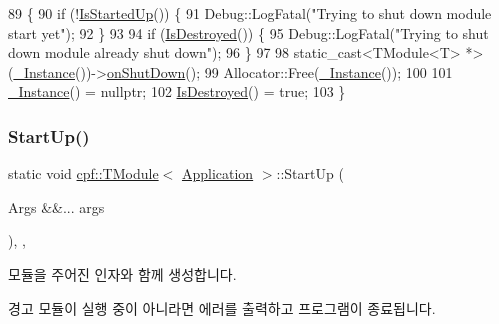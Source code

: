 \begin{DoxyCode}
89                                \{
90             \textcolor{keywordflow}{if} (!\hyperlink{classcpf_1_1_t_module_a73732afee7131dad652bf3e00c75cef9}{IsStartedUp}()) \{
91                 Debug::LogFatal(\textcolor{stringliteral}{"Trying to shut down module start yet"});
92             \}
93 
94             \textcolor{keywordflow}{if} (\hyperlink{classcpf_1_1_t_module_a9f70f0a70ac59b13b7a874f82c877337}{IsDestroyed}()) \{
95                 Debug::LogFatal(\textcolor{stringliteral}{"Trying to shut down module already shut down"});
96             \}
97 
98             \textcolor{keyword}{static\_cast<}TModule<T> *\textcolor{keyword}{>}(\hyperlink{classcpf_1_1_t_module_a06ab8af8ea6b294959937fd2bbc1e615}{\_Instance}())->\hyperlink{classcpf_1_1_t_module_a15c93b1aca54022e145961bea8e3ea7d}{onShutDown}();
99             Allocator::Free(\hyperlink{classcpf_1_1_t_module_a06ab8af8ea6b294959937fd2bbc1e615}{\_Instance}());
100 
101             \hyperlink{classcpf_1_1_t_module_a06ab8af8ea6b294959937fd2bbc1e615}{\_Instance}() = \textcolor{keyword}{nullptr};
102             \hyperlink{classcpf_1_1_t_module_a9f70f0a70ac59b13b7a874f82c877337}{IsDestroyed}() = \textcolor{keyword}{true};
103         \}
\end{DoxyCode}
\mbox{\label{classcpf_1_1_t_module_a02fbf3c4d28a3328e81b0e8d0bdd93b0}} 
\subsubsection{\texorpdfstring{Start\+Up()}{StartUp()}\hspace{0.1cm}{\footnotesize\ttfamily [1/2]}}
{\footnotesize\ttfamily static void \hyperlink{classcpf_1_1_t_module}{cpf\+::\+T\+Module}$<$ \hyperlink{classcpf_1_1_application}{Application}  $>$\+::Start\+Up (\begin{DoxyParamCaption}\item[{Args \&\&...}]{args }\end{DoxyParamCaption})\hspace{0.3cm}{\ttfamily [inline]}, {\ttfamily [static]}, {\ttfamily [inherited]}}

모듈을 주어진 인자와 함께 생성합니다. \begin{DoxyWarning}{경고}
모듈이 실행 중이 아니라면 에러를 출력하고 프로그램이 종료됩니다. 
\end{DoxyWarning}


